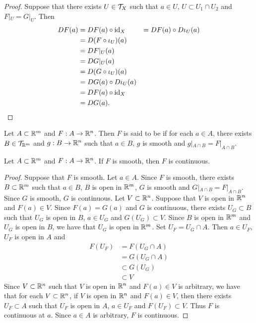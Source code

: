 \documentclass{book}
\begin{document}
	\begin{proof}
		Suppose that there exists $U \in \mathcal{T}_X$ such that $a \in U$, $U \subset U_1 \cap U_2$ and $F|_U = G|_U$. Then 
		\begin{align*}
			DF(a)
			& = DF(a) \circ \operatorname{id}_X
			& = DF(a) \circ D\iota_U(a) \\
			& = D(F \circ \iota_U)(a) \\
			& = DF|_U(a) \\
			& = DG|_U(a) \\
			& = D(G \circ \iota_U)(a) \\
			& = DG(a) \circ D\iota_U(a) \\
			& = DF(a) \circ \operatorname{id}_X \\
			& = DG(a).
		\end{align*}
	\end{proof}
	
	\begin{defn} 
		Let $A \subset \mathbb{R}^m$ and $F: A \rightarrow \mathbb{R}^n$. Then $F$ is said to be  if for each $a \in A$, there exists $B \in \mathcal{T}_{\mathbb{R}^m}$ and $g:B \rightarrow \mathbb{R}^n$ such that $a \in B$, $g$ is smooth and $g|_{A \cap B} = F|_{A \cap B}$. 
	\end{defn}

	\begin{ex} 
		Let $A \subset \mathbb{R}^m$ and $F: A \rightarrow \mathbb{R}^n$. If $F$ is smooth, then $F$ is continuous.
	\end{ex}

	\begin{proof}
		Suppose that $F$ is smooth. Let $a \in A$. Since $F$ is smooth, there exists $B \subset \mathbb{R}^m$ such that $a \in B$, $B$ is open in $\mathbb{R}^m$, $G$ is smooth and $G|_{A \cap B} = F|_{A \cap B}$.
		Since $G$ is smooth, $G$ is continuous. Let $V \subset \mathbb{R}^n$. Suppose that $V$ is open in $\mathbb{R}^n$ and $F(a) \in V$. Since $F(a) = G(a)$ and $G$ is continuous, there exists $U_G \subset B$ such that $U_G$ is open in $B$, $a \in U_G$ and $G(U_G) \subset V$. Since $B$ is open in $\mathbb{R}^m$ and $U_G$ is open in $B$, we have that $U_G$ is open in $\mathbb{R}^m$. Set $U_F = U_G \cap A$. Then $a \in U_F$, $U_F$ is open in $A$ and 
		\begin{align*}
			F(U_F)
			& = F(U_G \cap A) \\
			& = G(U_G \cap A) \\
			& \subset G(U_G) \\
			& \subset V 
		\end{align*}
		Since $V \subset \mathbb{R}^n$ such that $V$ is open in $\mathbb{R}^n$ and $F(a) \in V$ is arbitrary, we have that for each $V \subset \mathbb{R}^n$, if $V$ is open in $\mathbb{R}^n$ and $F(a) \in V$, then there exists $U_F \subset A$ such that $U_F$ is open in $A$, $a \in U_F$ and $F(U_F) \subset V$. Thus $F$ is continuous at $a$. Since $a \in A$ is arbitrary, $F$ is continuous. 
	\end{proof}
\end{document}
